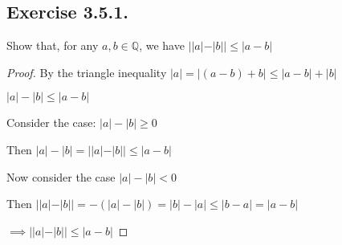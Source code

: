\documentclass[12pt, a4paper]{article}
\begin{document}
    \subsection*{Exercise 3.5.1.}
        Show that, for any $a,b \in \mathbb{Q}$, we have $||a|-|b|| \le |a-b|$
        \begin{proof}
            By the triangle inequality $|a|=|(a-b)+b| \le |a-b| + |b|$

            $|a|-|b| \le |a-b|$

            Consider the case: $|a|-|b| \ge 0$

            Then $|a|-|b| = ||a|-|b|| \le |a-b|$

            Now consider the case $|a|-|b| < 0$

            Then $||a|-|b|| = -(|a|-|b|) = |b|-|a| \le |b-a| = |a-b|$

            $\implies ||a|-|b|| \le |a-b|$ 
        \end{proof}
\end{document}
